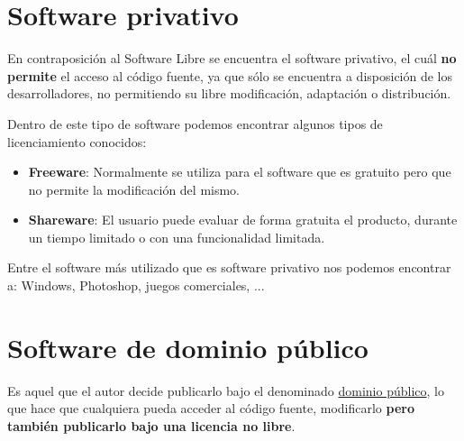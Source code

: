 {%
\let\subsubsection\subsection
\let\subsection\section
\let\section\foo



\graphicspath{{img/si}}


\subsection{Software privativo}
En contraposición al Software Libre se encuentra el software privativo, el cuál \textbf{no permite} el acceso al código fuente, ya que sólo se encuentra a disposición de los desarrolladores, no permitiendo su libre modificación, adaptación o distribución.

Dentro de este tipo de software podemos encontrar algunos tipos de licenciamiento conocidos:

\begin{itemize}
    \item \textbf{Freeware}: Normalmente se utiliza para el software que es gratuito pero que no permite la modificación del mismo.
    \item \textbf{Shareware}: El usuario puede evaluar de forma gratuita el producto, durante un tiempo limitado o con una funcionalidad limitada.
\end{itemize}

Entre el software más utilizado que es software privativo nos podemos encontrar a: Windows, Photoshop, juegos comerciales, ...

\subsection{Software de dominio público}
Es aquel que el autor decide publicarlo bajo el denominado \href{https://es.wikipedia.org/wiki/Dominio_p%C3%BAblico}{dominio público}, lo que hace que cualquiera pueda acceder al código fuente, modificarlo \textbf{pero también publicarlo bajo una licencia no libre}.

}
